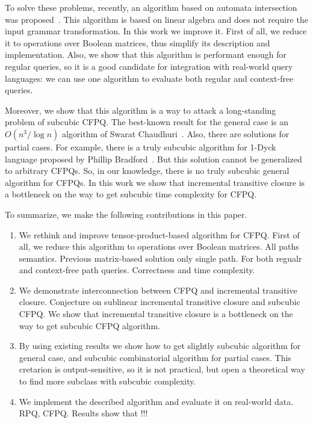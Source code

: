 To solve these problems, recently, an algorithm based on automata intersection was proposed~\cite{!!!}.
This algorithm is based on linear algebra and does not require the input grammar transformation.
In this work we improve it.
First of all, we reduce it to operations over Boolean matrices, thus simplify its description and implementation.
Also, we show that this algorithm is performant enough for regular queries, so it is a good candidate for integration with real-world query languages: we can use one algorithm to evaluate both regular and context-free queries. 

Moreover, we show that this algorithm is a way to attack a long-standing problem of subcubic CFPQ. 
The best-known result for the general case is an $O(n^3/\log{n})$ algorithm of Swarat Chaudhuri~\cite{10.1145/1328438.1328460}. 
Also, there are solutions for partial cases. 
For example, there is a truly subcubic algorithm for 1-Dyck language proposed by Phillip Bradford~\cite{8249039}.
But this solution cannot be generalized to arbitrary CFPQs. 
So, in our knowledge, there is no truly subcubic general algorithm for CFPQs. 
In this work we show that incremental transitive closure is a bottleneck on the way to get subcubic time complexity for CFPQ.

To summarize, we make the following contributions in this paper.
\begin{enumerate}
	\item We rethink and improve tensor-product-based algorithm for CFPQ. First of all, we reduce this algorithm to operations over Boolean matrices. All paths semantics. Previous matrix-based solution only single path. For both regualr and context-free path queries. Correctness and time complexity.
	\item We demonstrate interconnection between CFPQ and incremental transitive closure. Conjecture on sublinear incremental transitive closure and subcubic CFPQ. We show that incremental transitive closure is a bottleneck on the way to get subcubic CFPQ algorithm.
	\item By using existing results we show how to get slightly subcubic algorithm for general case, and subcubic combinatorial algorithm for partial cases. This cretarion is output-sensitive, so it is not practical, but open a theoretical way to find more subclass with subcubic complexity.
	\item We implement the described algorithm and evaluate it on real-world data. RPQ, CFPQ. Results show that !!!
\end{enumerate}